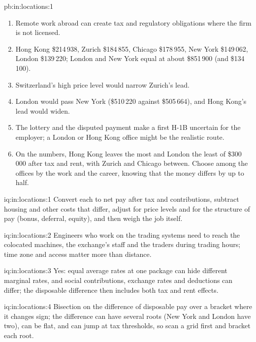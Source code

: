\begin{solution}{pb:in:locations:1}
\begin{enumerate}
\item Remote work abroad can create tax and regulatory obligations where the firm is not licensed.
\item Hong Kong \$214\,938, Zurich \$184\,855, Chicago \$178\,955, New York \$149\,062, London \$139\,220; London and New
York equal at about \$851\,900 (and \$134\,100).
\item Switzerland's high price level would narrow Zurich's lead.
\item London would pass New York (\$510\,220 against \$505\,664), and Hong Kong's lead would widen.
\item The lottery and the disputed payment make a first H-1B uncertain for the employer; a London or Hong Kong office
might be the realistic route.
\item On the numbers, Hong Kong leaves the most and London the least of \$300\,000 after tax and rent, with Zurich and
Chicago between. Choose among the offices by the work and the career, knowing that the money differs by up to half.
\end{enumerate}
\end{solution}

\begin{solution}{iq:in:locations:1}
Convert each to net pay after tax and contributions, subtract housing and other costs that differ, adjust for price levels
and for the structure of pay (bonus, deferral, equity), and then weigh the job itself.
\end{solution}

\begin{solution}{iq:in:locations:2}
Engineers who work on the trading systems need to reach the colocated machines, the exchange's staff and the traders
during trading hours; time zone and access matter more than distance.
\end{solution}

\begin{solution}{iq:in:locations:3}
Yes: equal average rates at one package can hide different marginal rates, and social contributions, exchange rates and
deductions can differ; the disposable difference then includes both tax and rent effects.
\end{solution}

\begin{solution}{iq:in:locations:4}
Bisection on the difference of disposable pay over a bracket where it changes sign; the difference can have several roots
(New York and London have two), can be flat, and can jump at tax thresholds, so scan a grid first and bracket each root.
\end{solution}

